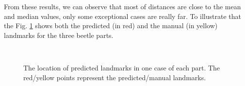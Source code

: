 \documentclass[review]{elsarticle}
\begin{document}
From these results, we can observe that most of distances are close to the mean and median
values, only some exceptional cases are really far. To illustrate that
the Fig. \ref{figpdl} shows both the predicted (in red) and the manual
(in yellow) landmarks for the three beetle parts.

\begin{figure}[h!]
    \centering
    ~~
    \\
    \caption{The location of predicted landmarks in one case of each part. The red/yellow points represent the predicted/manual landmarks.}
    \label{figpdl}
\end{figure}
\end{document}
